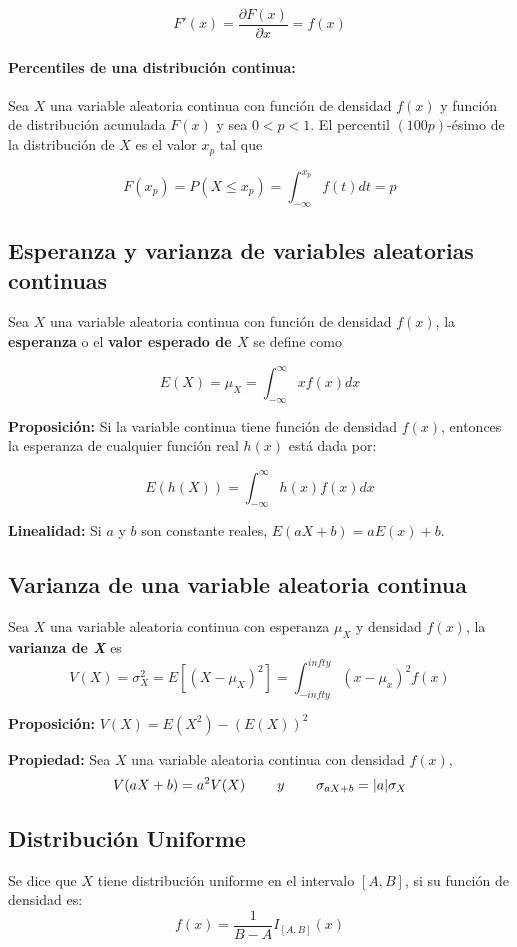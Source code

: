 $$F'(x) = \frac{\partial F(x)}{\partial x} = f(x)$$

\paragraph{Percentiles de una distribución continua: } Sea $X$ una variable aleatoria continua con función de densidad $f(x)$ y función de distribución acunulada $F(x)$ y sea $0<p<1$. El percentil $(100 p)$-ésimo de la distribución de $X$ es el valor $x_p$ tal que 

$$F(x_p) = P(X\leq x_p) = \int_{-\infty}^{x_p} f(t)dt = p$$
\subsection{Esperanza y varianza de variables aleatorias continuas}
Sea $X$ una variable aleatoria continua con función de densidad $f(x)$, la \textbf{esperanza} o el \textbf{valor esperado de $X$} se define como

$$E(X) = \mu_X = \int_{-\infty}^{\infty} xf(x)dx$$

\textbf{Proposición: } Si la variable continua tiene función de densidad $f(x)$, entonces la esperanza de cualquier función real $h(x)$ está dada por:

$$E(h(X)) = \int_{-\infty}^{\infty} h(x)f(x)dx$$

\textbf{Linealidad: } Si $a$ y $b$ son constante reales, $E(aX+b) = aE(x)+b$.

\subsection{Varianza de una variable aleatoria continua}
Sea $X$ una variable aleatoria continua con esperanza $\mu_X$ y densidad $f(x)$, la \textbf{varianza de \textit{X}} es
$$V(X) = \sigma_X^2 = E\left[\left(X-\mu_X\right)^2\right] = \int_{-infty}^{infty}(x-\mu_x)^2 f(x)$$

\textbf{Proposición: } $V(X) = E(X^2) - \left(E(X)\right)^2$

\textbf{Propiedad:} Sea $X$ una variable aleatoria continua con densidad $f(x)$, $$V(aX+b) = a^2V(X) \hspace*{8mm}y\hspace*{8mm} \sigma_{aX+b} = |a|\sigma_X$$

\subsection{Distribución Uniforme}
Se dice que $X$ tiene distribución uniforme en el intervalo $[A,B]$, si su función de densidad es:
$$f(x) =\frac{1}{B-A}I_{[A,B]}(x)$$

